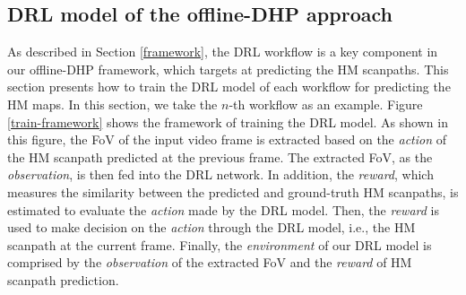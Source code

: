 \documentclass[10pt,journal,compsoc]{IEEEtran}
\begin{document}
\subsection{DRL model of the offline-DHP approach}
\label{train}
As described in Section \ref{framework}, the DRL workflow is a key component in our offline-DHP framework, which targets at predicting the HM scanpaths.
This section presents how to train the DRL model of each workflow for predicting the HM maps.
In this section, we take the $n$-th workflow as an example.
Figure \ref{train-framework} shows the framework of training the DRL model.
As shown in this figure, the FoV of the input video frame is extracted based on the \textit{action} of the HM scanpath predicted at the previous frame.
The extracted FoV, as the \textit{observation}, is then fed into the DRL network.
In addition, the \textit{reward}, which measures the similarity between the predicted and ground-truth HM scanpaths, is estimated to evaluate the \textit{action} made by the DRL model. Then, the \textit{reward} is used to make decision on the \textit{action} through the DRL model, i.e., the HM scanpath at the current frame.
Finally, the \textit{environment} of our DRL model is comprised by the \textit{observation} of the extracted FoV and the \textit{reward} of HM scanpath prediction.
\end{document}
